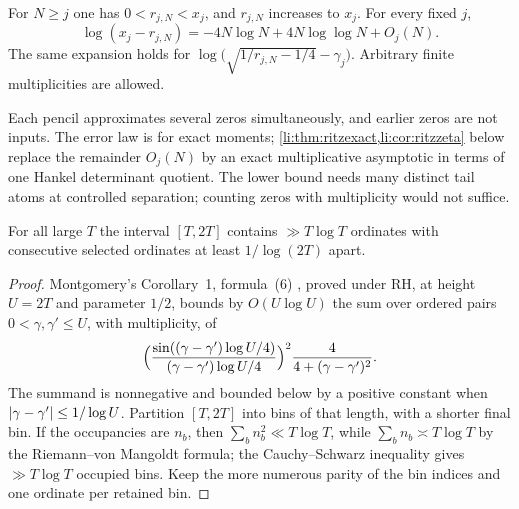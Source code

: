 \begin{theorem}\label{li:thm:ritz}
For $N\ge j$ one has $0<r_{j,N}<x_j$, and $r_{j,N}$ increases to $x_j$. For every fixed $j$,
\begin{equation}\label{li:eq:ritzrate}
 \log(x_j-r_{j,N})=-4N\log N+4N\log\log N+O_j(N).
\end{equation}
The same expansion holds for $\log\bigl(\sqrt{1/r_{j,N}-1/4}-\gamma_j\bigr)$. Arbitrary finite
multiplicities are allowed.
\end{theorem}

Each pencil approximates several zeros simultaneously, and earlier zeros are not inputs. The
error law is for exact moments; \cref{li:thm:ritzexact,li:cor:ritzzeta} below replace the remainder
$O_j(N)$ by an exact multiplicative asymptotic in terms of one Hankel determinant quotient. The lower bound needs many distinct tail atoms at controlled
separation; counting zeros with multiplicity would not suffice.

\begin{lemma}\label{li:lem:packing}
For all large $T$ the interval $[T,2T]$ contains $\gg T\log T$ ordinates with consecutive selected
ordinates at least $1/\log(2T)$ apart.
\end{lemma}

\begin{proof}
Montgomery's Corollary~1, formula~(6) \cite{Montgomery1973Pair}, proved under RH, at height $U=2T$
and parameter $1/2$, bounds by $O(U\log U)$ the sum over ordered pairs $0<\gamma,\gamma'\le U$, with
multiplicity, of
\[
 \Bigl(\frac{\sin((\gamma-\gamma')\log U/4)}{(\gamma-\gamma')\log U/4}\Bigr)^2\frac4{4+(\gamma-\gamma')^2}.
\]
The summand is nonnegative and bounded below by a positive constant when
$\lvert\gamma-\gamma'\rvert\le1/\log U$. Partition $[T,2T]$ into bins of that length, with a shorter final
bin. If the occupancies are $n_b$, then $\sum_bn_b^2\ll T\log T$, while $\sum_bn_b\asymp T\log T$ by
the Riemann--von Mangoldt formula; the Cauchy--Schwarz inequality gives $\gg T\log T$ occupied bins.
Keep the more numerous parity of the bin indices and one ordinate per retained bin.
\end{proof}

